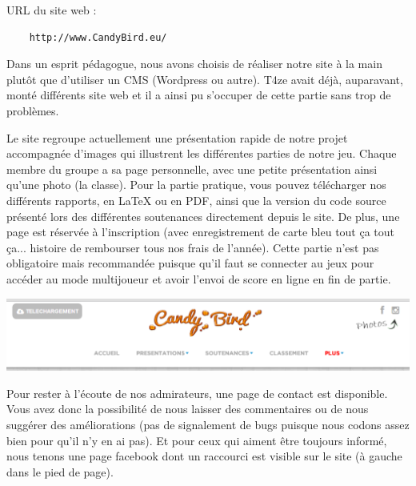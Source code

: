 \documentclass [11pt]{report}
\begin{document}
	\vspace{6mm}
	
	\noindent URL du site web : 
	\begin{Verbatim}
	http://www.CandyBird.eu/
	\end{Verbatim}
	
	\vspace{6mm}
	
	Dans un esprit pédagogue, nous avons choisis de réaliser notre site à la main plutôt que d'utiliser un CMS (Wordpress ou autre). T4ze avait déjà, auparavant, monté différents site web et il a ainsi pu s'occuper de cette partie sans trop de problèmes.
	
	Le site regroupe actuellement une présentation rapide de notre projet accompagnée d'images qui illustrent les différentes parties de notre jeu. Chaque membre du groupe a sa page personnelle, avec une petite présentation ainsi qu'une photo (la classe). Pour la partie pratique, vous pouvez télécharger nos différents rapports, en LaTeX ou en PDF, ainsi que la version du code source présenté lors des différentes soutenances directement depuis le site. De plus, une page est réservée à l'inscription (avec enregistrement de carte bleu tout ça tout ça... histoire de rembourser tous nos frais de l'année). Cette partie n'est pas obligatoire mais recommandée puisque qu'il faut se connecter au jeux pour accéder au mode multijoueur et avoir l'envoi de score en ligne en fin de partie.\\
	\vspace{4mm}
	
	\begin{center}
	\includegraphics[scale=0.5]{images/site.png}
	\end{center}
	
	\vspace{10mm}
	
	Pour rester à l'écoute de nos admirateurs, une page de contact est disponible. Vous avez donc la possibilité de nous laisser des commentaires ou de nous suggérer des améliorations (pas de signalement de bugs puisque nous codons assez bien pour qu'il n'y en ai pas). Et pour ceux qui aiment être toujours informé, nous tenons une page facebook dont un raccourci est visible sur le site (à gauche dans le pied de page).
	
\end{document}
